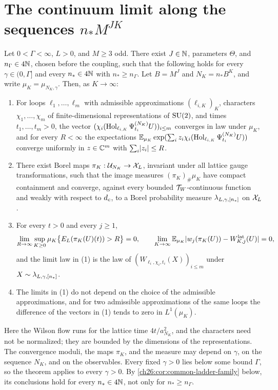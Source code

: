 \section{The continuum limit along the sequences \texorpdfstring{$n_*M^{JK}$}{n*M\^{}(JK)}}\label{ch26:sec:refinement-sequences}

\begin{theorem}\label{ch26:thm:finite-ceiling-tier-one}
Let $0<\Gamma<\infty$, $L>0$, and $M\ge3$ odd. There exist $J\in\mathbb N$, parameters $\Theta$, and $n_\Gamma\in4\mathbb N$, chosen before the coupling, such that the following holds for every $\gamma\in(0,\Gamma]$ and every $n_*\in4\mathbb N$ with $n_*\ge n_\Gamma$. Let $B=M^J$ and $N_K=n_*B^K$, and write $\mu_K=\mu_{N_K,\gamma}$. Then, as $K\to\infty$:
\begin{enumerate}
\item For loops $\ell_1,\dots,\ell_m$ with admissible approximations $(\ell_{i,K})_K$, characters $\chi_1,\dots,\chi_m$ of finite-dimensional representations of $\mathrm{SU}(2)$, and times $t_1,\dots,t_m>0$, the vector $(\chi_i(\operatorname{Hol}_{\ell_{i,K}}\Psi^{(N_K)}_{t_i}U))_{i\le m}$ converges in law under $\mu_K$, and for every $R<\infty$ the expectations $\mathbb E_{\mu_K}\exp(\sum_iz_i\chi_i(\operatorname{Hol}_{\ell_{i,K}}\Psi^{(N_K)}_{t_i}U))$ converge uniformly in $z\in\mathbb C^m$ with $\sum_i\lvert z_i\rvert\le R$.
\item There exist Borel maps $\pi_K:\mathcal U_{N_K}\to\mathcal X_L$, invariant under all lattice gauge transformations, such that the image measures $(\pi_K)_\#\mu_K$ have compact containment and converge, against every bounded $\mathcal T_W$-continuous function and weakly with respect to $d_c$, to a Borel probability measure $\lambda_{L,\gamma,[n_*]}$ on $\mathcal X_L$.
\item For every $t>0$ and every $j\ge1$,
\[
 \lim_{R\to\infty}\sup_{K\ge0}\mu_K\bigl\{E_L(\pi_K(U)(t))>R\bigr\}=0,\qquad \lim_{K\to\infty}\mathbb E_{\mu_K}\lvert w_j(\pi_K(U))-W^{\mathrm{lat}}_{K,j}(U)\rvert=0,
\]
and the limit law in (1) is the law of $(W_{\ell_i,\chi_i,t_i}(X))_{i\le m}$ under $X\sim\lambda_{L,\gamma,[n_*]}$.
\item The limits in (1) do not depend on the choice of the admissible approximations, and for two admissible approximations of the same loops the difference of the vectors in (1) tends to zero in $L^1(\mu_K)$.
\end{enumerate}
\end{theorem}

Here the Wilson flow runs for the lattice time $4t/a_{N_K}^2$, and the characters need not be normalized; they are bounded by the dimensions of the representations. The convergence moduli, the maps $\pi_K$, and the measure may depend on $\gamma$, on the sequence $N_K$, and on the observables. Every fixed $\gamma>0$ lies below some bound $\Gamma$, so the theorem applies to every $\gamma>0$. By \cref{ch26:cor:common-ladder-family} below, its conclusions hold for every $n_*\in4\mathbb N$, not only for $n_*\ge n_\Gamma$.


